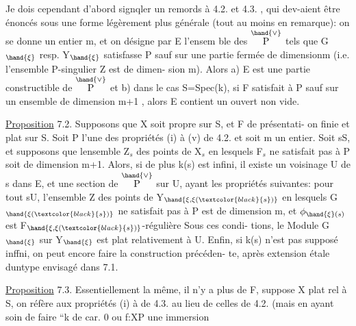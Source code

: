 
Je dois cependant d'abord signqler un remords à 4.2. et 4.3. , qui
dev-aient être énoncés sous une forme légèrement plus générale (tout au
moins en remarque): on se donne un entier m, et on désigne par E l'ensem
ble des \hand{$\xi\in$}$\overset{\hand{\vee}}{\text{P}}$ tels que G$_{\hand{\xi}}$ resp. Y$_{\hand{\xi}}$ satisfasse P sauf  sur une
partie fermée de dimension\hand{$\leq$}m (i.e. l'ensemble P-singulier Z est de dimen-%
sion\hand{$\leq$} m). Alors a) E est une partie constructible de $\overset{\hand{\vee}}{\text{P}}$ et b) dans le
cas S=Spec(k), si F  satisfait à P sauf  sur un ensemble de
dimension\hand{$\leq$} m+1 , alors E contient un ouvert non vide.

\uline{Proposition} 7.2. Supposons que X soit propre sur S, et F de présentati-%
on finie et plat sur S. Soit P l'une des propriétés (i) à (v) de 4.2.
et soit m un entier. Soit s\hand{$\in$}S, et supposons que 
 lensemble Z$_s$ des points de X$_s$ en lesquels F$_s$ ne satisfait
pas à P soit de dimension \hand{$\leq$} m+1. Alors, si de plus k(s) est infini, il
existe un voisinage U de s dans E, et une section \hand{$\xi$} de $\overset{\hand{\vee}}{\text{P}}$ sur U, ayant
les propriétés suivantes: pour tout s\hand{$\in$}U, l'ensemble Z des points
de  Y$_{\hand{\xi,\xi(\textcolor{black}{s})}}$ en lesquels G$_{\hand{\xi(\textcolor{black}{s})}}$ ne satisfait pas à P est de dimension
\hand{$\leq$}m, et $\phi_{\hand{\xi}(s)}$ est F$_{\hand{\xi,\xi(\textcolor{black}{s})}}$-régulière\hand{,}  Sous ces condi-%
tions, le Module G$_{\hand{\xi}}$ sur Y$_{\hand{\xi}}$ est plat relativement à U. Enfin, si k(s)
n'est pas supposé inffni, on peut encore faire la construction précéden-%
te, après extension étale duntype envisagé dans 7.1.

\uline{Proposition} 7.3. Essentiellement la même, il n'y a plus de F, 
suppose X plat rel à S, on réfère aux propriétés (i) à  de 4.3. au
lieu de celles de 4.2. (mais en ayant soin de faire  
``k de car. 0 ou f:X\hand{$\longrightarrow$}P une immersion\hand{\unsure{$\xi$}}

